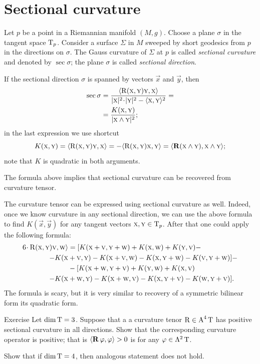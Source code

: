 \section{Sectional curvature}

Let $p$ be a point in a Riemannian manifold $(M,g)$.
Choose a plane $\sigma$ in the tangent space $\operatorname{\rm T}_p$. 
Consider a surface $\Sigma$ in $M$ sweeped by short geodesics from $p$ in the directions on $\sigma$.
The Gauss curvature of $\Sigma$ at $p$ is called \emph{sectional curvature} and denoted by $\sec\sigma$;
the plane $\sigma$ is called \emph{sectional direction}.

If the sectional direction $\sigma$ is spanned by vectors $\vec x$ and $\vec y$, then
\begin{align*}
\sec\sigma&=\frac{\langle \Rm(\vec x,\vec y)\vec y,\vec x\rangle}{|\vec x|^2\cdot|\vec y|^2-\langle\vec x,\vec y\rangle^2}=
\\
&=\frac{K(\vec x,\vec y)}{|\vec x\wedge\vec y|^2};
\end{align*}
in the last expression we use shortcut
\[K(\textsc x,\textsc y)=\langle \operatorname{\rm R}\nolimits(\textsc x,\textsc y)\textsc y,\textsc x\rangle=-\langle \operatorname{\rm R}\nolimits(\textsc x,\textsc y)\textsc x,\textsc y\rangle=\langle\operatorname{\bf R}\nolimits(\textsc x\wedge\textsc y),\textsc x\wedge\textsc y\rangle;\]
note that $K$ is quadratic in both arguments.

The formula above implies that sectional curvature can be recovered from curvature tensor.

The curvature tensor can be expressed using sectional curvature as well.
Indeed, once we know curvature in any sectional direction, we can use the above formula to find $K(\vec x,\vec y)$ for any tangent vectors $\textsc x,\textsc y\in\operatorname{\rm T}_p$.
After that one could apply the following  formula:
\begin{align*}
6\cdot \Rm(\vec x,\vec y)\vec v,\vec w\rangle&=
[K(\vec x+\vec v,\vec y+\vec w)
+K(\vec x,\vec w)
+K(\vec y,\vec v)-\\
-K(\vec x&+\vec v,\vec y)
-K(\vec x+\vec v,\vec w)
-K(\vec x,\vec y+\vec w)
-K(\vec v,\vec y+\vec w)
]-
\\
&-[K(\vec x+\vec w,\vec y+\vec v)
+K(\vec y,\vec w)
+K(\vec x,\vec v)
\\
-K(\vec x&+\vec w,\vec y)
-K(\vec x+\vec w,\vec v)
-K(\vec x,\vec y+\vec v)
-K(\vec w,\vec y+\vec v)].
\end{align*}
The formula is scary, but it is very similar to recovery of a symmetric bilinear form its quadratic form.

\begin{thm}{Exercise}\label{ex:sec/Rop}
Let $\operatorname{\rm dim}\nolimits\operatorname{\rm T}=3$.
Suppose that a a curvature tenor $\operatorname{\rm R}\nolimits\in\operatorname{\rm A}^4\operatorname{\rm T}$ has positive sectional curvature in all directions.
Show that the corresponding curvature operator is positive;
that is $\langle\operatorname{\bf R}\nolimits\varphi,\varphi\rangle>0$ is for any $\varphi\in\Lambda^2\operatorname{\rm T}$. 

Show that if $\operatorname{\rm dim}\nolimits\operatorname{\rm T}=4$, then analogous statement does not hold.
\end{thm}


